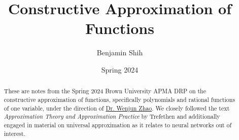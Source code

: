 \documentclass{article}
\title{Constructive Approximation of Functions}
\author{Benjamin Shih}
\date{Spring 2024}
\begin{document}
\begin{titlepage}
\thispagestyle{empty}
\maketitle

\begin{abstract}
  These are notes from the Spring 2024 Brown University APMA DRP on the constructive approximation of functions, specifically polynomials and rational functions of one variable, under the direction of \href{https://wenjunzhaowo.github.io}{Dr. Wenjun Zhao}. We closely followed the text \emph{Approximation Theory and Approximation Practice} by Trefethen \cite{atap} and additionally engaged in material on universal approximation \cite{surv} as it relates to neural networks out of interest.
\end{abstract}

\tableofcontents
\end{titlepage}






\newpage


\end{document}
